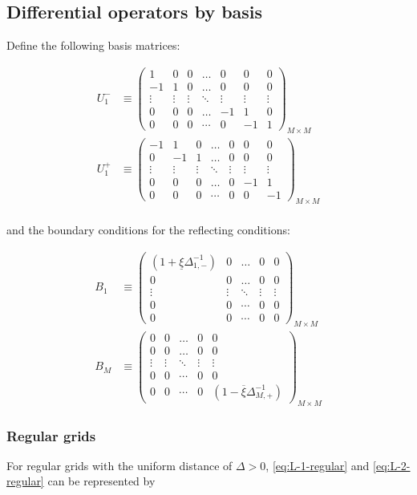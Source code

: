 \documentclass[11pt]{article}
\theoremstyle{definition}
\begin{document}
\iffalse
\subsection{Differential operators by basis}
Define the following basis matrices:

\begin{align}
U_1^{-} &\equiv \begin{pmatrix}
1  &0&0&\dots&0&0&0\\
-1&1&0&\dots&0&0&0\\
\vdots&\vdots&\vdots&\ddots&\vdots&\vdots&\vdots\\
0&0&0&\dots&-1&1&0\\
0&0&0&\cdots&0&-1&1
\end{pmatrix}_{M\times M}\label{eq:L-1-basis} \\
U_1^{+} &\equiv \begin{pmatrix}
-1  &1&0&\dots&0&0&0\\
0&-1&1&\dots&0&0&0\\
\vdots&\vdots&\vdots&\ddots&\vdots&\vdots&\vdots\\
0&0&0&\dots&0&-1&1\\
0&0&0&\cdots&0&0&-1
\end{pmatrix}_{M\times M}\label{eq:L-1+-basis} \\
\end{align}

and the boundary conditions for the reflecting conditions:

\begin{align}
B_{1}  &\equiv \begin{pmatrix}
(1 + \underline{\xi} \Delta^{-1}_{1,-}) &0&\dots&0&0\\
0&0&\dots&0&0\\
\vdots&\vdots&\ddots&\vdots&\vdots\\
0&0&\cdots&0&0\\
0&0&\cdots&0&0
\end{pmatrix}_{M\times M} \\
B_{M}  &\equiv \begin{pmatrix}
0 &0&\dots&0&0\\
0&0&\dots&0&0\\
\vdots&\vdots&\ddots&\vdots&\vdots\\
0&0&\cdots&0&0\\
0&0&\cdots&0&(1 - \overline{\xi} \Delta^{-1}_{M,+})
\end{pmatrix}_{M\times M}
\end{align}

\subsubsection{Regular grids}
For regular grids with the uniform distance of $\Delta > 0$, \eqref{eq:L-1-regular} and \eqref{eq:L-2-regular} can be represented by
\end{document}
